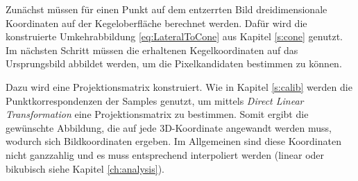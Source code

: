 Zunächst müssen für einen Punkt auf dem entzerrten Bild dreidimensionale Koordinaten auf der Kegeloberfläche berechnet werden. Dafür wird die konstruierte Umkehrabbildung \ref{eq:LateralToCone} aus Kapitel \ref{s:cone} genutzt. Im nächsten Schritt müssen die erhaltenen Kegelkoordinaten auf das Ursprungsbild abbildet werden, um die Pixelkandidaten bestimmen zu können.

Dazu wird eine Projektionsmatrix konstruiert. Wie in Kapitel \ref{s:calib} werden die  Punktkorrespondenzen der Samples genutzt, um mittels \textit{Direct Linear Transformation} eine Projektionsmatrix zu bestimmen.
Somit ergibt die gewünschte Abbildung, die auf jede 3D-Koordinate angewandt werden muss, wodurch sich Bildkoordinaten ergeben. Im Allgemeinen sind diese Koordinaten nicht ganzzahlig und es muss entsprechend interpoliert werden (linear oder bikubisch siehe Kapitel \ref{ch:analysis}).

